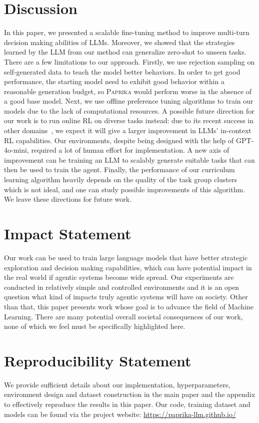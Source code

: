 \documentclass{article}
\newcommand{\ours}[1]{\textsc{Paprika}}
\theoremstyle{plain}
\theoremstyle{definition}
\theoremstyle{remark}
\begin{document}
\section{Discussion}
In this paper, we presented a scalable fine-tuning method to improve multi-turn decision making abilities of LLMs. Moreover, we showed that the strategies learned by the LLM from our method can generalize zero-shot to unseen tasks. There are a few limitations to our approach. Firstly, we use rejection sampling on self-generated data to teach the model better behaviors. In order to get good performance, the starting model need to exhibit good behavior within a reasonable generation budget, so \ours{} would perform worse in the absence of a good base model. Next, we use offline preference tuning algorithms to train our models due to the lack of computational resources. A possible future direction for our work is to run online RL on diverse tasks instead: due to its recent success in other domains~\citep{deepseekai2025deepseekr1incentivizingreasoningcapability}, we expect it will give a larger improvement in LLMs' in-context RL capabilities. Our environments, despite being designed with the help of GPT-4o-mini, required a lot of human effort for implementation. A new axis of improvement can be training an LLM to scalably generate suitable tasks that can then be used to train the agent. Finally, the performance of our curriculum learning algorithm heavily depends on the quality of the task group clusters which is not ideal, and one can study possible improvements of this algorithm. We leave these directions for future work.
\section*{Impact Statement}
Our work can be used to train large language models that have better strategic exploration and decision making capabilities, which can have potential impact in the real world if agentic systems become wide spread. Our experiments are conducted in relatively simple and controlled environments and it is an open question what kind of impacts truly agentic systems will have on society. Other than that, this paper presents work whose goal is to advance the field of Machine Learning. There are many potential overall societal consequences of our work, none of which we feel must be specifically highlighted here.
\section*{Reproducibility Statement}
We provide sufficient details about our implementation, hyperparameters, environment design and dataset construction in the main paper and the appendix to effectively reproduce the results in this paper. Our code, training dataset and models can be found via the project website: \url{https://paprika-llm.github.io/}
\end{document}
